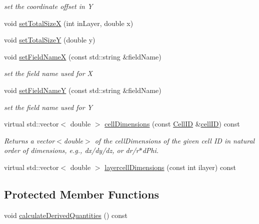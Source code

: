 \begin{DoxyCompactItemize}
\begin{DoxyCompactList}\small\item\em set the coordinate offset in Y \end{DoxyCompactList}\item 
void \hyperlink{class_d_d4hep_1_1_d_d_segmentation_1_1_megatile_layer_grid_x_y_a280c3a98334f9c11ceb580d27b03bf70}{set\+Total\+SizeX} (int in\+Layer, double x)
\item 
void \hyperlink{class_d_d4hep_1_1_d_d_segmentation_1_1_megatile_layer_grid_x_y_ae87f5055295fe08dc28352c996bd9a0f}{set\+Total\+SizeY} (double y)
\item 
void \hyperlink{class_d_d4hep_1_1_d_d_segmentation_1_1_megatile_layer_grid_x_y_a3f1b9a1540d75d71d29df2c0b40da730}{set\+Field\+NameX} (const std\+::string \&field\+Name)
\begin{DoxyCompactList}\small\item\em set the field name used for X \end{DoxyCompactList}\item 
void \hyperlink{class_d_d4hep_1_1_d_d_segmentation_1_1_megatile_layer_grid_x_y_a19e5ddea2f004ff1b991f16cff99648b}{set\+Field\+NameY} (const std\+::string \&field\+Name)
\begin{DoxyCompactList}\small\item\em set the field name used for Y \end{DoxyCompactList}\item 
virtual std\+::vector$<$ double $>$ \hyperlink{class_d_d4hep_1_1_d_d_segmentation_1_1_megatile_layer_grid_x_y_ae5a4d3e66dc61711c51261818429fd75}{cell\+Dimensions} (const \hyperlink{namespace_d_d4hep_1_1_d_d_segmentation_ac7af071d85cb48820914434a07e21ba1}{Cell\+ID} \&\hyperlink{class_d_d4hep_1_1_d_d_segmentation_1_1_megatile_layer_grid_x_y_a594269129ed71d3dbb0b9da7181fa58a}{cell\+ID}) const
\begin{DoxyCompactList}\small\item\em Returns a vector$<$double$>$ of the cell\+Dimensions of the given cell ID in natural order of dimensions, e.\+g., dx/dy/dz, or dr/r$\ast$d\+Phi. \end{DoxyCompactList}\item 
virtual std\+::vector$<$ double $>$ \hyperlink{class_d_d4hep_1_1_d_d_segmentation_1_1_megatile_layer_grid_x_y_a4796d3c86d0db3ab905ec062fb24a654}{layercell\+Dimensions} (const int ilayer) const
\end{DoxyCompactItemize}
\subsection*{Protected Member Functions}
\begin{DoxyCompactItemize}
\item 
void \hyperlink{class_d_d4hep_1_1_d_d_segmentation_1_1_megatile_layer_grid_x_y_ad569c63f36618b49bbacdda3ab9af6b5}{calculate\+Derived\+Quantities} () const
\end{DoxyCompactItemize}
